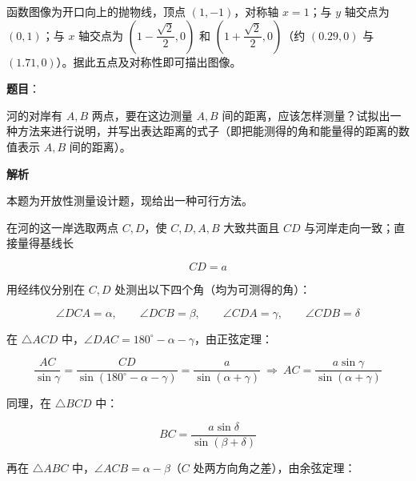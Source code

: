\begin{answer}

函数图像为开口向上的抛物线，顶点 $(1,-1)$，对称轴 $x=1$；与 $y$ 轴交点为 $(0,1)$；与 $x$ 轴交点为 $\left(1-\dfrac{\sqrt2}2,0\right)$ 和 $\left(1+\dfrac{\sqrt2}2,0\right)$（约 $(0.29,0)$ 与 $(1.71,0)$）。据此五点及对称性即可描出图像。





\end{answer}
\begin{answer}

\textbf{题目}：

河的对岸有 $A,B$ 两点，要在这边测量 $A,B$ 间的距离，应该怎样测量？试拟出一种方法来进行说明，并写出表达距离的式子（即把能测得的角和能量得的距离的数值表示 $A,B$ 间的距离）。

\textbf{解析}

本题为开放性测量设计题，现给出一种可行方法。

在河的这一岸选取两点 $C,D$，使 $C,D,A,B$ 大致共面且 $CD$ 与河岸走向一致；直接量得基线长

\nopagebreak[4]
\[
CD=a
\]

用经纬仪分别在 $C,D$ 处测出以下四个角（均为可测得的角）：

\nopagebreak[4]
\[
\angle DCA=\alpha,\qquad \angle DCB=\beta,\qquad \angle CDA=\gamma,\qquad \angle CDB=\delta
\]

在 $\triangle ACD$ 中，$\angle DAC=180^\circ-\alpha-\gamma$，由正弦定理：

\nopagebreak[4]
\[
\frac{AC}{\sin\gamma}=\frac{CD}{\sin(180^\circ-\alpha-\gamma)}=\frac{a}{\sin(\alpha+\gamma)}
\ \Longrightarrow\
AC=\frac{a\sin\gamma}{\sin(\alpha+\gamma)}
\]

同理，在 $\triangle BCD$ 中：

\nopagebreak[4]
\[
BC=\frac{a\sin\delta}{\sin(\beta+\delta)}
\]

再在 $\triangle ABC$ 中，$\angle ACB=\alpha-\beta$（$C$ 处两方向角之差），由余弦定理：


\end{answer}

